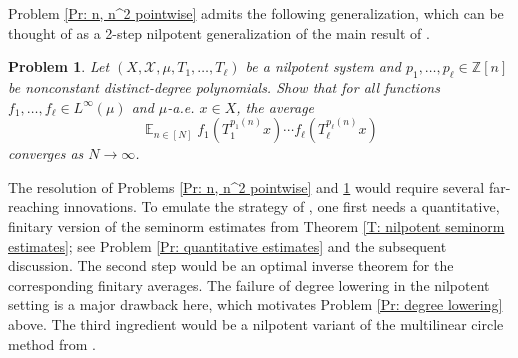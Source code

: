 \documentclass[11pt]{amsart}
\newtheorem{problem}{Problem}
\theoremstyle{definition}
\DeclareMathOperator*{\E}{\mathbb{E}}
\newcommand{\Z}{{\mathbb Z}}
\newcommand{\CX}{{\mathcal X}}
\newcommand{\1}{{\mathbf{1}}}
\begin{document}
Problem \ref{Pr: n, n^2 pointwise} %
admits the following generalization, which can be thought of as a 2-step nilpotent generalization of the main result of \cite{KMPWW24}.
\begin{problem}\label{Pr: distinct-degree pointwise}
     Let $(X, \CX, \mu, T_1, \ldots, T_\ell)$ be a nilpotent system and  $p_1, \ldots, p_\ell\in\Z[n]$ be nonconstant distinct-degree polynomials. Show that for all functions $f_1, \ldots, f_\ell\in L^\infty(\mu)$ and $\mu$-a.e. $x\in X$, the average  
     \[\E_{n\in[N]}f_1(T_1^{p_1(n)}x)\cdots f_\ell(T_\ell^{p_\ell(n)}x)\]
     converges as $N\to\infty$. 
\end{problem}
The resolution of Problems \ref{Pr: n, n^2 pointwise} and \ref{Pr: distinct-degree pointwise} would require several far-reaching innovations. To emulate the strategy of \cite{KMPWW24, KMT20}, one first needs a quantitative, finitary version of the seminorm estimates from Theorem \ref{T: nilpotent seminorm estimates}; see Problem \ref{Pr: quantitative estimates} and the subsequent discussion. The second step would be an optimal inverse theorem for the corresponding finitary averages. The failure of degree lowering in the nilpotent setting is a major drawback here, which motivates Problem \ref{Pr: degree lowering} above. The third ingredient would be a nilpotent variant of the multilinear circle method from \cite{KMPWW24, KMT20}.
\end{document}
